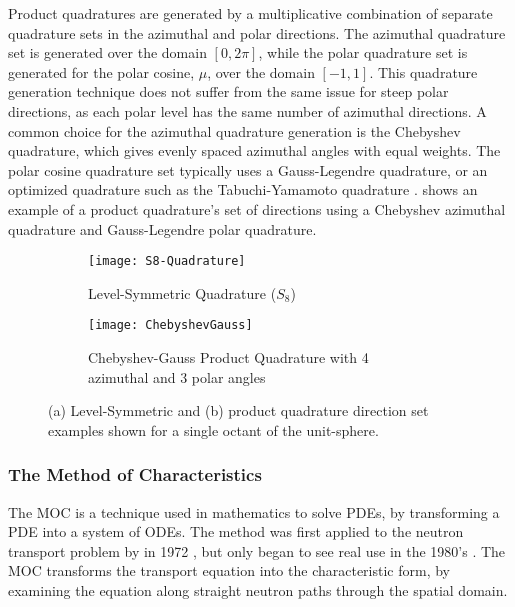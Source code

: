 {{{{                Product quadratures are generated by a multiplicative combination of separate quadrature sets in the azimuthal and polar directions.
                The azimuthal quadrature set is generated over the domain $[0,2\pi]$, while the polar quadrature set is generated for the polar cosine, $\mu$, over the domain $[-1,1]$.
                This quadrature generation technique does not suffer from the same issue for steep polar directions, as each polar level has the same number of azimuthal directions.
                A common choice for the azimuthal quadrature generation is the Chebyshev quadrature, which gives evenly spaced azimuthal angles with equal weights.
                The polar cosine quadrature set typically uses a Gauss-Legendre quadrature, or an optimized quadrature such as the Tabuchi-Yamamoto quadrature \cite{TabuchiYamamotoQuad}.
                 shows an example of a product quadrature's set of directions using a Chebyshev azimuthal quadrature and Gauss-Legendre polar quadrature.

                \begin{figure}[h]
                    \centering
                    \begin{subfigure}[t]{0.45\linewidth}
                        \centering
                        \texttt{[image: S8-Quadrature]}
                        \caption{Level-Symmetric Quadrature ($S_8$)}
                        \label{fig:NTT:S8 Quadrature}
                    \end{subfigure}%
                    \hfill
                    \begin{subfigure}[t]{0.45\linewidth}
                        \centering
                        \texttt{[image: ChebyshevGauss]}
                        \caption{Chebyshev-Gauss Product Quadrature with 4 azimuthal and 3 polar angles}
                        \label{fig:NTT:ChebyshevGauss Quadrature}
                    \end{subfigure}
                    \caption{(a) Level-Symmetric and (b) product quadrature direction set examples shown for a single octant of the unit-sphere.}
                    \label{fig:NTT:Quadrature Examples}
                \end{figure}
            }
            \subsubsection{The Method of Characteristics}{\label{sssec:NTT:MOC}
                The \acf{MOC} is a technique used in mathematics to solve \acp{PDE}, by transforming a \ac{PDE} into a system of \acp{ODE}.
                The method was first applied to the neutron transport problem by \citeauthor{Askew1972} in 1972 \cite{Askew1972}, but only began to see real use in the 1980's \cite{Halsall1980}.
                The \ac{MOC} transforms the transport equation into the characteristic form, by examining the equation along straight neutron paths through the spatial domain.

}}}}
